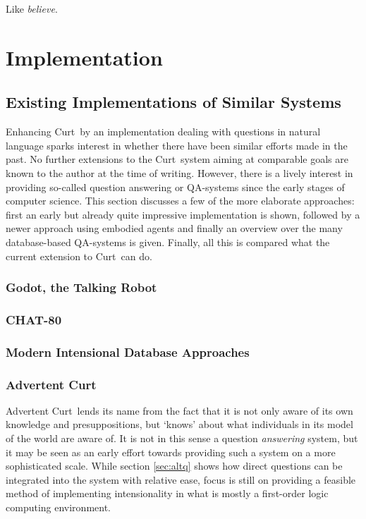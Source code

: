 \documentclass[12pt,a4paper]{article}
\newcommand{\pn}{\textsf} %
\newcommand{\curt}{\pn{Curt}\mbox{ }}
\newcommand{\acurt}{\pn{Advertent Curt}\mbox{ }}
\theoremstyle{remark} \newtheorem*{termin}{Definition} %
\begin{document}
Like \emph{believe}.

\section{Implementation}

\subsection{Existing Implementations of Similar Systems}\label{sec:othercrap}

Enhancing \curt by an implementation dealing with questions in natural language
sparks interest in whether there have been similar efforts made in the past. No
further extensions to the \curt system aiming at comparable goals are known to the
author at the time of writing. However, there is a lively interest in providing
so-called question answering or QA-systems since the early stages of computer
science. %
This section discusses a few of the more elaborate approaches: first an early
but already quite impressive implementation is shown, followed by a newer approach
using embodied agents and finally an overview over the many database-based
QA-systems is given. Finally, all this is compared what the current extension to
\curt can do.


\subsubsection{Godot, the Talking Robot}

\subsubsection{CHAT-80}

\subsubsection{Modern Intensional Database Approaches}

\subsubsection{Advertent Curt}

\acurt lends its name from the fact that it is not only aware of its own
knowledge and presuppositions, but `knows' about what individuals in its
model of the world are aware of. It is not in this sense a question
\emph{answering} system, but it may be seen as an early effort towards providing
such a system on a more sophisticated scale. While section \ref{sec:altq} shows
how direct questions can be integrated into the system with relative ease, focus
is still on providing a feasible method of implementing intensionality in what
is mostly a first-order logic computing environment.
\end{document}

